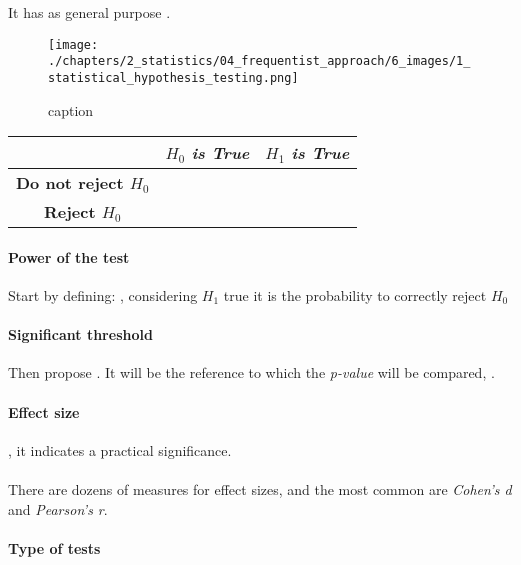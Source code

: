 It has as general purpose .
\begin{figure}[H]
    \begin{center}
        \texttt{[image: ./chapters/2\_statistics/04\_frequentist\_approach/6\_images/1\_statistical\_hypothesis\_testing.png]}
    \end{center}
    \caption{caption}
    \label{fig:4.6.1_statistical_hypothesis_testing}
\end{figure}

\begin{center}
    \begin{tabular}{*{3}{|c}|}
    \hline
    & \textbf{$H_{0}$ \emph{is True}} & \textbf{$H_{1}$ \emph{is True}}\\
    \hline
        \textbf{Do not reject $H_{0}$} &  & \\
    \hline
        \textbf{Reject $H_{0}$} &  & \\
    \hline
    \end{tabular}
\end{center}

\paragraph{Power of the test}
Start by defining: , considering $H_{1}$ true it is the probability 
to correctly reject $H_{0}$

\paragraph{Significant threshold}
Then propose . It will be the
reference to which the \emph{p-value} will be compared, .

\paragraph{Effect size}
, it indicates a practical significance.\\
\\
There are dozens of measures for effect sizes, and the most common are \emph{Cohen's d} 
and \emph{Pearson's r}.

\paragraph{Type of tests}
